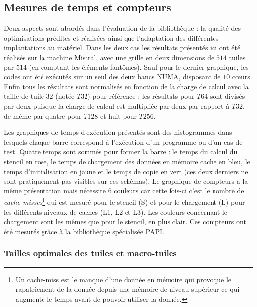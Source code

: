 \subsection{Mesures de temps et compteurs}

Deux aspects sont abordés dans l'évaluation de la bibliothèque : la qualité des optimisations prédites et réalisées ainsi que l'adaptation des différentes implantations au matériel. Dans les deux cas les résultats présentés ici ont été réalisés sur la machine \textsf{Mistral}, avec une grille en deux dimensions de $514$ tuiles par $514$ (en comptant les éléments fantômes). Sauf pour le dernier graphique, les codes ont été exécutés sur un seul des deux bancs NUMA, disposant de $10$ cœurs. Enfin tous les résultats sont normalisés en fonction de la charge de calcul avec la taille de tuile $32$ (notée $T32$) pour référence : les résultats pour $T64$ sont divisés par deux puisque la charge de calcul est multipliée par deux par rapport à $T32$, de même par quatre pour $T128$ et huit pour $T256$. 

Les graphiques de temps d'exécution présentés sont des histogrammes dans lesquels chaque barre correspond à l'exécution d'un programme ou d'un cas de test. Quatre temps sont sommés pour former la barre : le temps du calcul du stencil en rose, le temps de chargement des données en mémoire cache en bleu, le temps d'initialisation en jaune et le temps de copie en vert (ces deux derniers ne sont pratiquement pas visibles sur ces schémas). Le graphique de compteurs a la même présentation mais nécessite $6$ couleurs car cette fois-ci c'est le nombre de \emph{cache-misses}\footnote{Un cache-miss est le manque d'une donnée en mémoire qui provoque le rapatriement de la donnée depuis une mémoire de niveau supérieur ce qui augmente le temps avant de pouvoir utiliser la donnée.} qui est mesuré pour le stencil (S) et pour le chargement (L) pour les différents niveaux de caches (L1, L2 et L3). Les couleurs concernant le chargement sont les mêmes que pour le stencil, en plus clair. Ces compteurs ont été mesurés grâce à la bibliothèque spécialisée \textsf{PAPI}.

\subsubsection*{Tailles optimales des tuiles et macro-tuiles}

